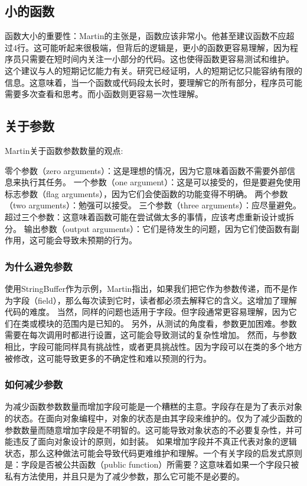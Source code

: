 \subsection{小的函数}

函数大小的重要性：Martin的主张是，函数应该非常小。他甚至建议函数不应超过4行。这可能听起来很极端，但背后的逻辑是，更小的函数更容易理解，因为程序员只需要在短时间内关注一小部分的代码。这也使得函数更容易测试和维护。
这个建议与人的短期记忆能力有关。研究已经证明，人的短期记忆只能容纳有限的信息。这意味着，当一个函数或代码段太长时，要理解它的所有部分，程序员可能需要多次查看和思考。而小函数则更容易一次性理解。



\subsection{关于参数}
Martin关于函数参数数量的观点:

零个参数（zero arguments）：这是理想的情况，因为它意味着函数不需要外部信息来执行其任务。
一个参数（one argument）：这是可以接受的，但是要避免使用标志参数（flag arguments），因为它们会使函数的功能变得不明确。
两个参数（two arguments）：勉强可以接受。
三个参数（three arguments）：应尽量避免。
超过三个参数：这意味着函数可能在尝试做太多的事情，应该考虑重新设计或拆分。
输出参数（output arguments）：它们是待发生的问题，因为它们使函数有副作用，这可能会导致未预期的行为。

\subsubsection{为什么避免参数}

使用StringBuffer作为示例，Martin指出，如果我们把它作为参数传递，而不是作为字段（field），那么每次读到它时，读者都必须去解释它的含义。这增加了理解代码的难度。
当然，同样的问题也适用于字段。但字段通常更容易理解，因为它们在类或模块的范围内是已知的。
另外，从测试的角度看，参数更加困难。参数需要在每次调用时都进行设置，这可能会导致测试的复杂性增加。
然而，与参数相比，字段可能同样具有挑战性，或者更具挑战性。因为字段可以在类的多个地方被修改，这可能导致更多的不确定性和难以预测的行为。

\subsubsection{如何减少参数}
为减少函数参数数量而增加字段可能是一个糟糕的主意。字段存在是为了表示对象的状态。在面向对象编程中，对象的状态是由其字段来维护的。仅为了减少函数的参数数量而随意增加字段是不明智的。这可能导致对象状态的不必要复杂性，并可能违反了面向对象设计的原则，如封装。
如果增加字段并不真正代表对象的逻辑状态，那么这种做法可能会导致代码更难维护和理解。一个有关字段的启发式原则是：字段是否被公共函数（public function）所需要？这意味着如果一个字段只被私有方法使用，并且只是为了减少参数，那么它可能不是必要的。

